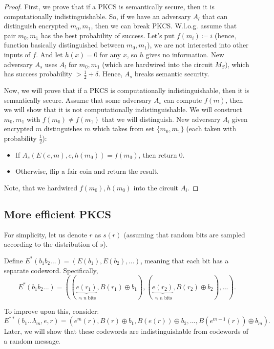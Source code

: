 \begin{proof}
	First, we prove that if a PKCS is semantically secure, then it is computationally indistinguishable.
	So, if we have an adversary $A_l$ that can distinguish encrypted $m_0, m_1$, then we can break PKCS.
	W.l.o.g. assume that pair $m_0, m_1$ has the best probability of success.
	Let's put $f(m_i) \coloneqq i$ (hence, function basically distinguished between $m_0, m_1$), we are not interested into other inputs of $f$.
	And let $h(x) = 0$ for any  $x$, so  $h$ gives no information.
	New adversary  $A_s$ uses $A_l$ for  $m_0, m_1$ (which are hardwired into the circuit $M_S$), which has success probability $> \frac{1}{2} + \delta$.
	Hence, $A_s$ breaks semantic security.

	Now, we will prove that if a PKCS is computationally indistinguishable, then it is semantically secure.
	Assume that some adversary $A_s$ can compute  $f(m)$, then we will show that it is not computationally indistinguishable.
	We will construct  $m_0, m_1$ with $f(m_0) \neq  f(m_1)$ that we will distinguish.
	New adversary $A_l$ given encrypted  $m$ distinguishes  $m$ which takes from set $\{m_0, m_1\} $ (each taken with probability $\frac{1}{2}$):
	\begin{itemize}
		\item If $A_s(E(e, m), e, h(m_0)) = f(m_0)$, then return 0.
		\item Otherwise, flip a fair coin and return the result.
	\end{itemize}
	Note, that we hardwired $f(m_0), h(m_0)$ into the circuit $A_l$.
\end{proof}

\subsection{More efficient PKCS}

For simplicity, let us denote $r$ as $s(r)$ (assuming that random bits are sampled according to the distribution of $s$).

Define $E^*(b_1 b_2 \ldots) = (E(b_1), E(b_2), \ldots)$, meaning that each bit has a separate codeword. Specifically,
\[
	E^*(b_1 b_2 \ldots) = \left(\left(\underbrace{e(r_1)}_{\approx n \text{ bits}}, B(r_1) \oplus b_1\right), \left(\underbrace{e(r_2)}_{\approx n \text{ bits}}, B(r_2) \oplus b_2\right), \ldots\right).
\] 

To improve upon this, consider:
\[
	E^{**}(b_1 \ldots b_m, e, r) = \left(e^{m}(r), B(r) \oplus b_1, B(e(r)) \oplus b_2, \ldots, B(e^{m - 1}(r)) \oplus b_m\right).
\] 
Later, we will show that these codewords are indistinguishable from codewords of a random message.
